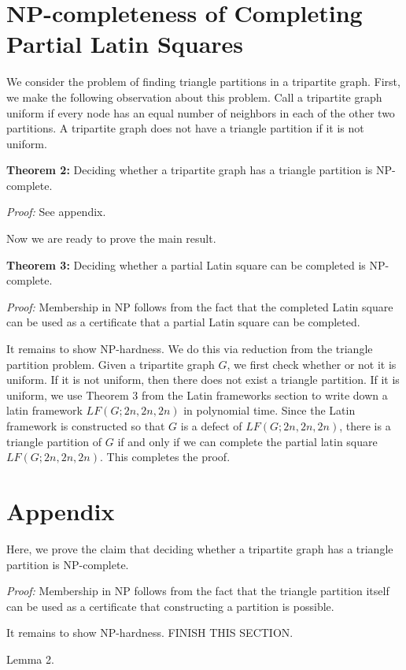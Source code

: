 \documentclass[11pt]{article}
\begin{document}
\section{NP-completeness of Completing Partial Latin Squares}

We consider the problem of finding triangle partitions in a tripartite graph. First, we make the following observation about this problem. Call a tripartite graph uniform if every node has an equal number of neighbors in each of the other two partitions. A tripartite graph does not have a triangle partition if it is not uniform. 

\textbf{Theorem 2:} Deciding whether a tripartite graph has a triangle partition is NP-complete.

\emph{Proof:} See appendix.

Now we are ready to prove the main result.

\textbf{Theorem 3:} Deciding whether a partial Latin square can be completed is NP-complete.

\emph{Proof:} Membership in NP follows from the fact that the completed Latin square can be used as a certificate that a partial Latin square can be completed.

It remains to show NP-hardness. We do this via reduction from the triangle partition problem. Given a tripartite graph $G$, we first check whether or not it is uniform. If it is not uniform, then there does not exist a triangle partition. If it is uniform, we use Theorem 3 from the Latin frameworks section to write down a latin framework $LF(G;2n,2n,2n)$ in polynomial time. Since the Latin framework is constructed so that $G$ is a defect of $LF(G;2n,2n,2n)$, there is a triangle partition of $G$ if and only if we can complete the partial latin square $LF(G;2n,2n,2n)$. This completes the proof.

\section{Appendix}

Here, we prove the claim that deciding whether a tripartite graph has a triangle partition is NP-complete.

\emph{Proof: } Membership in NP follows from the fact that the triangle partition itself can be used as a certificate that constructing a partition is possible.

It remains to show NP-hardness. FINISH THIS SECTION.

Lemma 2.
\end{document}
